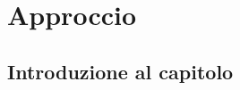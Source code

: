 \chapter{Approccio}
\label{chap:approccio}

\acresetall

%
%
%
%
%
%

\section{Introduzione al capitolo}

